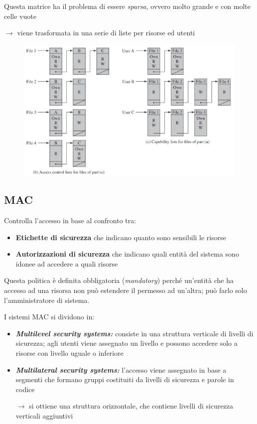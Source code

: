 Questa matrice ha il problema di essere \textit{sparsa}, ovvero molto grande e 
con molte celle vuote

$\rightarrow$ viene trasformata in una serie di liste per risorse ed utenti

\begin{figure}[H]
    \centering
    \includegraphics[width=1\linewidth]{chapters/3/images/dac-list.png}
\end{figure}


\subsection{MAC}
Controlla l'accesso in base al confronto tra:
\begin{itemize}
    \item \textbf{Etichette di sicurezza} che indicano quanto sono sensibili le risorse 
    \item \textbf{Autorizzazioni di sicurezza} che indicano quali entità del sistema 
    sono idonee ad accedere a quali risorse 
\end{itemize}

\noindent Questa politica è definita obbligatoria (\textit{mandatory}) perché un'entità che ha accesso 
ad una risorsa non può estendere il permesso ad un'altra; può farlo solo l'amministratore di sistema.

\noindent I sistemi MAC si dividono in:
\begin{itemize}
    \item \textbf{\textit{Multilevel security systems:}} consiste in una struttura verticale di 
    livelli di sicurezza; agli utenti viene assegnato un livello e possono accedere solo a risorse
    con livello uguale o inferiore 
    \item \textbf{\textit{Multilateral security systems:}} l'accesso viene assegnato in base a segmenti che formano 
    gruppi costituiti da livelli di sicurezza e parole in codice 

    $\rightarrow$ si ottiene una struttura orizzontale, che contiene livelli di sicurezza verticali aggiuntivi
\end{itemize}

